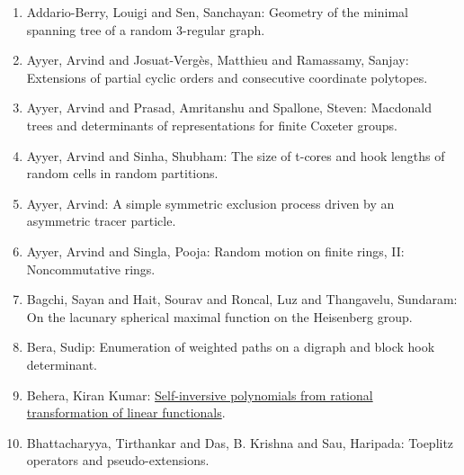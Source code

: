 \medskip


\vspace{-2.5mm}

\begin{enumerate}[resume, leftmargin=27pt]
	\item\label{sen:random-3-regular-graph} Addario-Berry, Louigi and Sen, Sanchayan: Geometry of the minimal spanning tree of a random 3-regular graph.

	\item\label{ayyer:partial-cyclic-orders} Ayyer, Arvind and Josuat-Verg\`es, Matthieu and Ramassamy, Sanjay: Extensions of partial cyclic orders and consecutive coordinate polytopes.

	\item\label{ayyer:Coxeter-groups} Ayyer, Arvind and Prasad, Amritanshu and Spallone, Steven: Macdonald trees and
	      determinants of representations for finite Coxeter groups.

	\item Ayyer, Arvind and Sinha, Shubham: The size of t-cores and hook lengths of random cells in random partitions.

	\item Ayyer, Arvind: A simple symmetric exclusion process driven by an asymmetric tracer particle.

	\item\label{ayyer-singla:noncommutative-rings} Ayyer, Arvind and Singla, Pooja: Random motion on finite rings, II:
	      Noncommutative rings.

	\item\label{thangavelu:Heisenberg-group} Bagchi, Sayan and  Hait, Sourav and  Roncal, Luz and Thangavelu, Sundaram: On the lacunary spherical maximal function on the Heisenberg group.

	\item Bera, Sudip: Enumeration of weighted paths on a digraph and block hook determinant.

	\item Behera, Kiran Kumar: \href{https://arxiv.org/abs/1909.12548}{Self-inversive polynomials from rational transformation of linear functionals}.

	\item\label{bhattacharyya:pseudo-extensions} Bhattacharyya, Tirthankar and Das, B. Krishna  and Sau, Haripada: Toeplitz operators
	      and pseudo-extensions.


\end{enumerate}
